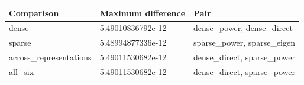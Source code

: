 \begin{tabular}{lll}
\hline
Comparison & Maximum difference & Pair \\
\hline
dense & 5.49010836792e-12 & dense\_power, dense\_direct \\
sparse & 5.48994877336e-12 & sparse\_power, sparse\_eigen \\
across\_representations & 5.49011530682e-12 & dense\_direct, sparse\_power \\
all\_six & 5.49011530682e-12 & dense\_direct, sparse\_power \\
\hline
\end{tabular}
